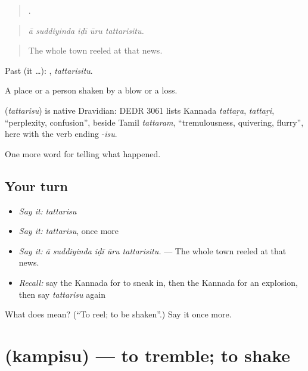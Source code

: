 \begin{quote}
    .
\end{quote}

\begin{quote}
\emph{ā suddiyinda iḍī ūru tattarisitu.}
\end{quote}

\begin{quote}
The whole town reeled at that news.
\end{quote}

Past (it …): , \emph{tattarisitu}.

A place or a person shaken by a blow or a loss.

\begin{cousinweb}
\textbf{} (\emph{tattarisu}) is native Dravidian: DEDR 3061 lists Kannada \emph{tattaṟa}, \emph{tattaṟi}, \textquotedblleft{}perplexity, confusion\textquotedblright{}, beside Tamil \emph{tattaram}, \textquotedblleft{}tremulousness, quivering, flurry\textquotedblright{}, here with the verb ending -\emph{isu}.
\end{cousinweb}

\begin{grammarlens}[title={What you've built}]
One more word for telling what happened.
\end{grammarlens}

\subsection*{Your turn}
\begin{itemize}
\raggedright
  \item \emph{Say it:} \emph{tattarisu}
  \item \emph{Say it:} \emph{tattarisu}, once more
  \item \emph{Say it:} \emph{ā suddiyinda iḍī ūru tattarisitu.} — The whole town reeled at that news.
  \item \emph{Recall:} say the Kannada for to sneak in, then the Kannada for an explosion, then say \emph{tattarisu} again
\end{itemize}

\begin{tcolorbox}[breakable,colback=teal!4,colframe=teal!35!black,title={Before you move on}]
What does  mean? (\textquotedblleft{}To reel; to be shaken\textquotedblright{}.) Say it once more.
\end{tcolorbox}
\section[\texorpdfstring{\kn{ಕಂಪಿಸು} (kampisu)}{ಕಂಪಿಸು (kampisu)}]{ (kampisu) — to tremble; to shake}

